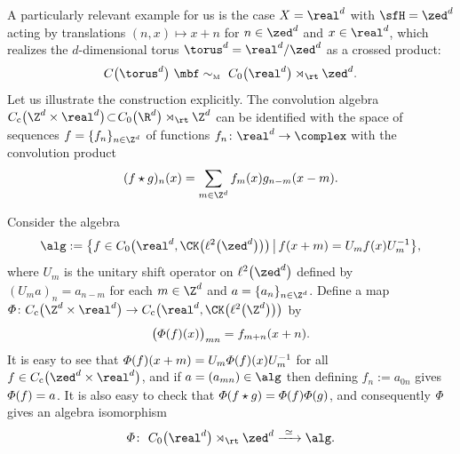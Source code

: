 \begin{Example}[tori]\label{ex:Moritatori}
A particularly relevant example for us is the case $X=\real^d$ with
$\sfH=\zed^d$ acting by translations $(n,x)\mapsto x+n$ for
$n\in\zed^d$ and $x\in\real^d$, which realizes the
$d$-dimensional torus $\torus^d=\real^d/\zed^d$ as a crossed product:
\[
C\big(\torus^d\big) \ \mbf\sim_{\text{\tiny M}} \ C_0\big(\real^d\big)\rtimes_\rt \zed^d .
\]
Let us illustrate the construction explicitly. The convolution algebra
$C_{\rm c}\big(\Z^d\times\real^d\big)\!\subset\! C_0\big(\R^d\big)\rtimes_\rt\Z^d$ can be
identified with the space of sequences $f=\{f_n\}_{n\in\Z^d}$ of
functions $f_n\colon \real^d\to\complex$ with the convolution product
\[
(f\star g)_n(x) = \sum_{m\in\Z^d} f_m(x) g_{n-m}(x-m) .
\]

Consider the algebra
\[
\alg:=\big\{f\in C_0\big(\real^d,\CK\big(\ell^2\big(\zed^d\big)\big)\big) \, \big| \, f(x+m)
= U_m f(x) U_{m}^{-1}\big\} ,
\]
where $U_m$ is the unitary shift operator on $\ell^2\big(\zed^d\big)$ defined by
$(U_ma)_n=a_{n-m}$ for each $m\in\Z^d$ and $a=\{a_n\}_{n\in\Z^d}$.
Define a map ${\mit\Phi}\colon C_{\rm c}\big(\Z^d\times\real^d\big)\to
C_{\rm c}\big(\real^d,\CK\big(\ell^2\big(\Z^d\big)\big)\big)$ by
\[
\big({\mit\Phi}(f)(x)\big)_{mn} = f_{m+n}(x+n) .
\]
It is easy to see that ${\mit\Phi}(f)(x+m) =
U_m {\mit\Phi}(f)(x) U_m^{-1}$ for all $f\in C_{\rm
 c}\big(\zed^d\times\real^d\big)$, and if $a=(a_{mn})\in\alg$ then defining
$f_n:=a_{0n}$ gives ${\mit\Phi}(f)=a$. It is also easy to check that
${\mit\Phi}(f\star g) = {\mit\Phi}(f) {\mit\Phi}(g)$, and consequently
$\mit\Phi$ gives an algebra isomorphism
\[
{\mit\Phi}\colon \ C_0\big(\real^d\big)\rtimes_\rt\zed^d \xrightarrow{ \ \simeq \ } \alg .
\]


\end{Example}
